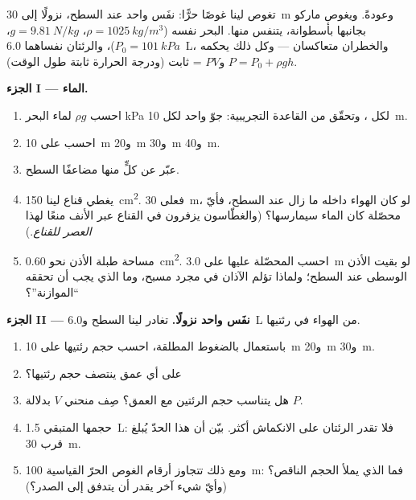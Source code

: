 \begin{problem}
\label{pb:g10:pressure:1}
تغوص لينا غوصًا حرًّا: نفَس واحد عند السطح، نزولًا إلى \qty{30}{m} وعودةً.
ويغوص ماركو بجانبها بأسطوانة، يتنفس منها. البحر نفسه
($\rho = \qty{1025}{kg/m^3}$، $g = \qty{9.81}{N/kg}$،
$P_0 = \qty{101}{kPa}$)، والرئتان نفساهما \qty{6.0}{L}، والخطران متعاكسان ---
وكل ذلك يحكمه $P = P_0 + \rho g h$ و$PV$ = ثابت (ودرجة الحرارة
ثابتة طول الوقت).

\medskip
\noindent\textbf{الجزء I ---  الماء.}
\begin{enumerate}
  \item احسب $\rho g$ لماء البحر  \unit{kPa} لكل ،
        وتحقّق من القاعدة التجريبية: جوّ واحد لكل \qty{10}{m}.
  \item احسب  على \qty{10}{m} و\qty{20}{m}
        و\qty{30}{m} و\qty{40}{m}.
  \item عبّر عن كلٍّ منها مضاعفًا  السطح.
  \item يغطي قناع لينا \qty{150}{cm^2}. فعلى \qty{30}{m}، لو كان الهواء
        داخله ما زال عند  السطح، فأيّ  محصّلة
        كان الماء سيمارسها؟ (والغطّاسون يزفرون في القناع عبر الأنف
        منعًا لهذا \emph{العصر للقناع}.)
  \item مساحة طبلة الأذن نحو \qty{0.60}{cm^2}. احسب  المحصّلة
        عليها على \qty{3.0}{m} لو بقيت الأذن الوسطى عند 
        السطح؛ ولماذا تؤلم الآذان في مجرد مسبح، وما الذي يجب أن
        تحققه ``الموازنة''؟
\end{enumerate}

\medskip
\noindent\textbf{الجزء II --- نفَس واحد نزولًا.}
تغادر لينا السطح و\qty{6.0}{L} من الهواء في رئتيها.
\begin{enumerate}[resume]
  \item باستعمال  بالضغوط المطلقة، احسب حجم رئتيها
        على \qty{10}{m} و\qty{20}{m} و\qty{30}{m}.
  \item على أي عمق ينتصف حجم رئتيها؟
  \item هل يتناسب حجم الرئتين مع العمق؟ صِف منحني
        $V$ بدلالة  $P$.
  \item حجمها المتبقي \qty{1.5}{L}: فلا تقدر الرئتان على الانكماش
        أكثر. بيّن أن هذا الحدّ يُبلغ قرب \qty{30}{m}.
  \item ومع ذلك تتجاوز أرقام الغوص الحرّ القياسية \qty{100}{m}: فما الذي
        يملأ الحجم الناقص؟ (وأيّ شيء آخر يقدر أن يتدفق إلى الصدر؟)
\end{enumerate}


\end{problem}
